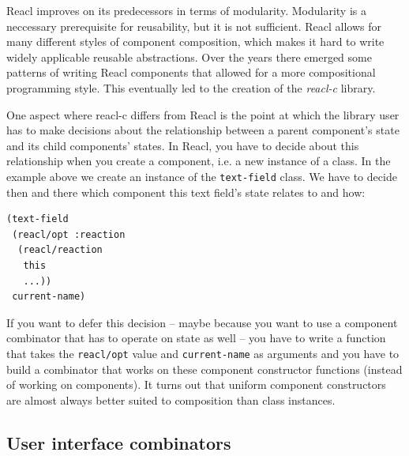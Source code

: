 \documentclass[sigplan,screen]{acmart}
\begin{document}
Reacl improves on its predecessors in terms of modularity. Modularity
is a neccessary prerequisite for reusability, but it is not
sufficient. Reacl allows for many different styles of component
composition, which makes it hard to write widely applicable reusable
abstractions. Over the years there emerged some patterns of writing
Reacl components that allowed for a more compositional programming
style. This eventually led to the creation of the \textit{reacl-c}
library.

One aspect where reacl-c differs from Reacl is the point at which the
library user has to make decisions about the relationship between a
parent component's state and its child components' states. In Reacl,
you have to decide about this relationship when you create a
component, i.e. a new instance of a class. In the example above we
create an instance of the \texttt{text-field} class. We have to decide
then and there which component this text field's state relates to and
how:
%
\begin{verbatim}
(text-field
 (reacl/opt :reaction
  (reacl/reaction
   this
   ...))
 current-name)
\end{verbatim}
%
If you want to defer this decision -- maybe because you want to use a
component combinator that has to operate on state as well -- you have
to write a function that takes the \texttt{reacl/opt} value and
\texttt{current-name} as arguments and you have to build a combinator
that works on these component constructor functions (instead of
working on components). It turns out that uniform component
constructors are almost always better suited to composition than class
instances.


\subsection{User interface combinators}
\end{document}
